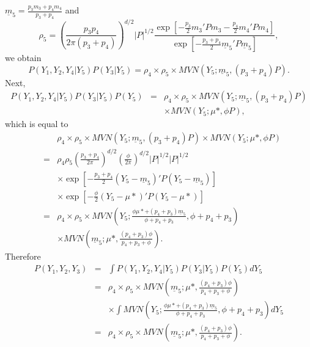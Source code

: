 \documentclass[12pt]{article}
\begin{document}
$\underline{m}_5 = \frac{p_3 m_3 + p_4 m_4}{p_3 + p_4} $ and 
\begin{equation}
\rho_5 =  \left( \frac{p_3 p_4}{2 \pi (p_3 + p_4)} \right)^{d/2}  |P|^{1/2} \frac {\exp \left[ -\frac{p_3}{2} m_3' P m_3 -\frac{p_4}{2}m_4'P m_4  \right] }
{ \exp \left[ -\frac{p_3 + p_4}{2} \underline{m}_5' P \underline{m}_5 \right] } ,
\end{equation}
we obtain
\begin{equation}
P(Y_1,Y_2,Y_4 | Y_5) P(Y_3 | Y_5) = \rho_4 \times \rho_5 \times MVN (Y_5 ; \underline{m}_5, (p_3 + p_4)P) .
\end{equation}
Next, 
\begin{eqnarray}
P(Y_1,Y_2,Y_4 | Y_5) P(Y_3 | Y_5) P(Y_5) & = & \rho_4 \times \rho_5 \times MVN (Y_5 ; \underline{m}_5, (p_3 + p_4)P) \\
& & \times MVN(Y_5; \mu*, \phi P),
\end{eqnarray}
which is equal to
\begin{eqnarray}
& & \rho_4 \times \rho_5 \times MVN (Y_5 ; \underline{m}_5, (p_3 + p_4)P) \times MVN(Y_5; \mu*, \phi P) \\
& = & \rho_4 \rho_5 \left( \frac{p_3 + p_4}{2 \pi} \right) ^{d/2}  \left( \frac{ \phi }{2 \pi} \right) ^{d/2} |P|^{1/2} |P|^{1/2} \\
& & \times \exp \left[ -\frac{ p_3 + p_4 }{2} \left( Y_5  - \underline{m}_5  \right)' P \left( Y_5 - \underline{m}_5  \right)  \right] \\
& &  \times \exp \left[ -\frac{\phi}{2} \left( Y_5  - \mu*  \right)' P \left( Y_5 - \mu*  \right)  \right]  \\
& = & \rho_4 \times \rho_5 \times MVN \left(Y_5; \frac{\phi \mu* + (p_4 + p_3) \underline{m}_5 }{\phi + p_4 + p_3}, \phi + p_4 + p_3 \right) \\
& & \times MVN \left(\underline{m}_5;\mu*, \frac{(p_4 + p_3)\phi}{p_4 + p_3 + \phi} \right) .
\end{eqnarray}
Therefore
\begin{eqnarray}
P(Y_1,Y_2,Y_3) & = & \int P(Y_1,Y_2,Y_4 | Y_5) P(Y_3 | Y_5) P(Y_5) dY_5 \\
& = & \rho_4 \times \rho_5 \times MVN(\underline{m}_5;\mu*, \frac{(p_4 + p_3)\phi}{p_4 + p_3 + \phi}) \\
& & \times \int MVN \left(Y_5; \frac{\phi \mu* + (p_4 + p_3) \underline{m}_5 }{\phi + p_4 + p_3}, \phi + p_4 + p_3 \right) dY_5 \\
& = & \rho_4 \times \rho_5 \times MVN \left(\underline{m}_5;\mu*, \frac{(p_4 + p_3)\phi}{p_4 + p_3 + \phi} \right) .
\end{eqnarray}
\end{document}
